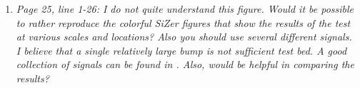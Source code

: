 \documentclass[a4paper,12pt]{article}
\begin{document}
\begin{enumerate}[label=(\arabic*),leftmargin=0.8cm]


\item \textit{Page 25, line 1-26: I do not quite understand this figure. Would it be possible to rather reproduce the colorful SiZer figures that show the results of the test at various scales and locations? Also you should use several different signals. I believe that a single relatively large bump is not sufficient test bed. A good collection of signals can be found in \cite{DonohoJohnstone1995}. Also, would \cite{HannigLeePark2013} be helpful in comparing the results?}



\end{enumerate}
\end{document}
